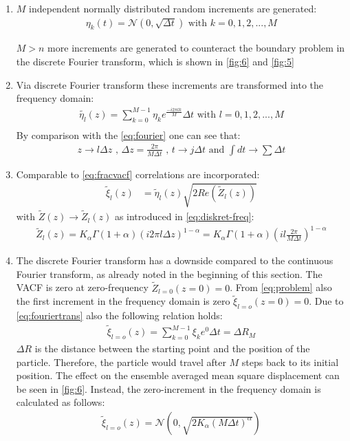 \documentclass[
  a4paper,BCOR10mm,oneside,
  bibtotoc,idxtotoc,
  headsepline,footsepline,%
  fleqn,openbib
]{scrbook}
\begin{document}
\begin{enumerate}
 \item $M$ independent normally distributed random increments are generated: 
\begin{align}
 \eta_k(t)= \mathcal{N}(0,\sqrt{\Delta t}) \text{  with  } k=0,1,2,...,M 
\end{align}

$M>n$  more increments are generated to counteract the boundary problem in the discrete Fourier transform, which is shown in \cref{fig:6} and \cref{fig:5}

\item Via discrete Fourier transform these increments are transformed into the frequency domain:
\begin{align}
 \tilde{\eta_l}(z)=\sum_{k=0}^{M-1} \eta_k e^{\frac{- i 2 \pi  l k }{M}} \Delta t   \text{  with  }  l=0,1,2,...,M  \label{eq:fouriertrans}\\ 
\end{align}
By comparison with the \cref{eq:fourier} one can see that:
\begin{align}
 z \rightarrow  l \Delta z \text{ , } \Delta z =   \frac{2 \pi }{M \Delta t} \text{ , } t \rightarrow j \Delta t \text{ and } \int dt \rightarrow \sum \Delta t \label{eq:diskret-freq} 
\end{align}
 
\item Comparable to \cref{eq:fracvacf} correlations are incorporated: 
 \begin{align}
   \tilde{\xi}_{l}(z)&= \tilde{\eta}_l(z) \sqrt{2 Re( \tilde{Z}_l(z))} \label{eq:problem} 
  \end{align}
 with $\tilde{Z}(z)\rightarrow \tilde{Z}_l(z)$ as introduced in \cref{eq:diskret-freq}:
  \begin{align}
   \tilde{Z}_l(z) = K_{\alpha} \Gamma(1+\alpha)(i 2 \pi l \Delta z)^{1-\alpha} =  K_{\alpha} \Gamma(1+\alpha)(i l \frac{ 2 \pi}{M \Delta t})^{1-\alpha} 
 \end{align}
 
 \item The discrete Fourier transform has a downside compared to the continuous Fourier transform, as already noted in the beginning of this section. The VACF is zero at zero-frequency $ \tilde{Z}_{l=0}(z=0)=0$.  From \cref{eq:problem} also the first increment in the frequency domain is zero $ \tilde{\xi}_{l=o}(z=0)= 0$. Due to \cref{eq:fouriertrans} also the following relation holds:
 \begin{align}
   \tilde{\xi}_{l=o}(z) = \sum_{k=0}^{M-1} \xi_k e^{0} \Delta t = \Delta  R_{M} \label{correction}
 \end{align}
$\Delta R $ is the distance between the starting point and the position of the particle. Therefore, the particle would travel after $M$ steps back to its initial position. The effect on the ensemble averaged mean square displacement can be seen in \cref{fig:6}. Instead, the zero-increment in the frequency domain is calculated as follows:
\begin{align}
 \tilde{\xi}_{l=o}(z) = \mathcal{N}(0,\sqrt{2 K_{\alpha} (M \Delta t)^\alpha})
\end{align}


\end{enumerate}
\end{document}
